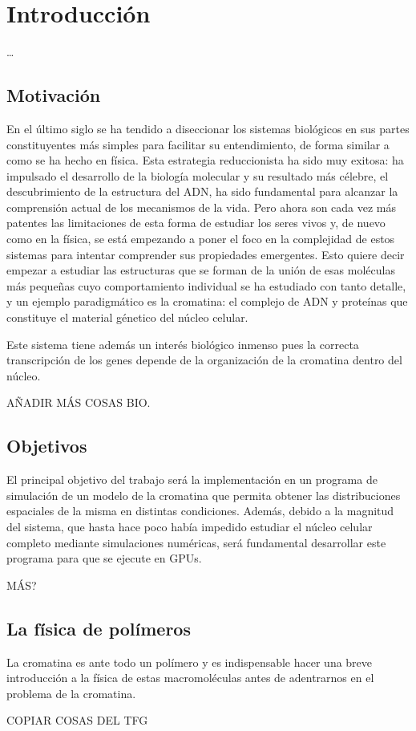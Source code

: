 \chapter{Introducción}
\label{cap:introduction}

\dots

\section{Motivación}

En el último siglo se ha tendido a diseccionar los sistemas biológicos en sus partes constituyentes más simples para facilitar su entendimiento, de forma similar a como se ha hecho en física. Esta estrategia reduccionista ha sido muy exitosa: ha impulsado el desarrollo de la biología molecular y su resultado más célebre, el descubrimiento de la estructura del ADN, ha sido fundamental para alcanzar la comprensión actual de los mecanismos de la vida. Pero ahora son cada vez más patentes las limitaciones de esta forma de estudiar los seres vivos y, de nuevo como en la física, se está empezando a poner el foco en la complejidad de estos sistemas para intentar comprender sus propiedades emergentes. Esto quiere decir empezar a estudiar las estructuras que se forman de la unión de esas moléculas más pequeñas cuyo comportamiento individual se ha estudiado con tanto detalle, y un ejemplo paradigmático es la cromatina: el complejo de ADN y proteínas que constituye el material génetico del núcleo celular.

Este sistema tiene además un interés biológico inmenso pues la correcta transcripción de los genes depende de la organización de la cromatina dentro del núcleo.

AÑADIR MÁS COSAS BIO.

\section{Objetivos}

El principal objetivo del trabajo será la implementación en un programa de simulación de un modelo de la cromatina que permita obtener las distribuciones espaciales de la misma en distintas condiciones. Además, debido a la magnitud del sistema, que hasta hace poco había impedido estudiar el núcleo celular completo mediante simulaciones numéricas, será fundamental desarrollar este programa para que se ejecute en GPUs.

MÁS?

\section{La física de polímeros}

La cromatina es ante todo un polímero y es indispensable hacer una breve introducción a la física de estas macromoléculas antes de adentrarnos en el problema de la cromatina.

COPIAR COSAS DEL TFG
